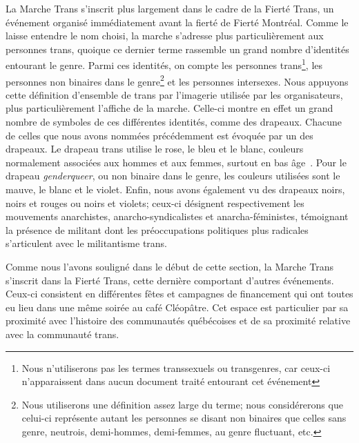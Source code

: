 La Marche Trans s'inscrit plus largement dans le cadre de la Fierté Trans, un événement organisé immédiatement avant la fierté de Fierté Montréal.
Comme le laisse entendre le nom choisi, la marche s'adresse plus particulièrement aux personnes trans, quoique ce dernier terme rassemble un grand nombre d'identités entourant le genre.
Parmi ces identités, on compte les personnes trans\footnote{Nous n'utiliserons pas les termes transsexuels ou transgenres, car ceux-ci n'apparaissent dans aucun document traité entourant cet événement}, les personnes non binaires dans le genre\footnote{Nous utiliserons une définition assez large du terme; nous considérerons que celui-ci représente autant les personnes se disant non binaires que celles sans genre, neutrois, demi-hommes, demi-femmes, au genre fluctuant, etc.\citep[see][]{Barker2015}} et les personnes intersexes.
Nous appuyons cette définition d'ensemble de trans par l'imagerie utilisée par les organisateurs, plus particulièrement l'affiche de la marche.
Celle-ci montre en effet un grand nombre de symboles de ces différentes identités, comme des drapeaux.
Chacune de celles que nous avons nommées précédemment est évoquée par un des drapeaux.
Le drapeau trans utilise le rose, le bleu et le blanc, couleurs normalement associées aux hommes et aux femmes, surtout en bas âge~\citep[quoique, selon les biens de consommation, ces couleurs sont souvent utilisées, surtout pour les produits féminins; voir][]{Koller2008}.
Pour le drapeau \emph{genderqueer}, ou non binaire dans le genre, les couleurs utilisées sont le mauve, le blanc et le violet.
Enfin, nous avons également vu des drapeaux noirs, noirs et rouges ou noirs et violets; ceux-ci désignent respectivement les mouvements anarchistes, anarcho-syndicalistes et anarcha-féministes, témoignant la présence de militant dont les préoccupations politiques plus radicales s'articulent avec le militantisme trans.

Comme nous l'avons souligné dans le début de cette section, la Marche Trans s'inscrit dans la Fierté Trans, cette dernière comportant d'autres événements.
Ceux-ci consistent en différentes fêtes et campagnes de financement qui ont toutes eu lieu dans une même soirée au café Cléopâtre.
Cet espace est particulier par sa proximité avec l'histoire des communautés \lgbt{} québécoises et de sa proximité relative avec la communauté trans.

